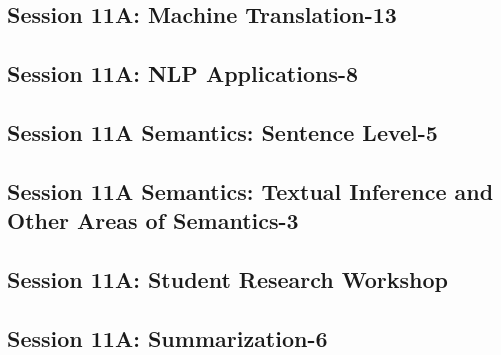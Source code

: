 \subsection{\large Session 11A: Machine Translation-13}
\label{parallel-session-11A-trackC}
\TrackCLoc\hfill\sessionchair{}{}
\clearpage
\subsection{\large Session 11A: NLP Applications-8}
\label{parallel-session-11A-trackD}
\TrackDLoc\hfill\sessionchair{}{}
\clearpage
\subsection{\large Session 11A Semantics: Sentence Level-5}
\label{parallel-session-11A-trackE}
\TrackELoc\hfill\sessionchair{}{}
\clearpage
\subsection{\large Session 11A Semantics: Textual Inference and Other Areas of Semantics-3}
\label{parallel-session-11A-trackF}
\TrackFLoc\hfill\sessionchair{}{}
\clearpage
\subsection{\large Session 11A: Student Research Workshop}
\label{parallel-session-11A-trackG}
\TrackGLoc\hfill\sessionchair{}{}
\clearpage
\subsection{\large Session 11A: Summarization-6}
\label{parallel-session-11A-trackH}
\TrackHLoc\hfill\sessionchair{}{}
\clearpage
